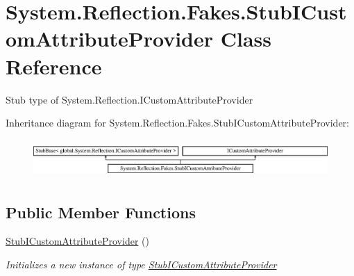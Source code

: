 \hypertarget{class_system_1_1_reflection_1_1_fakes_1_1_stub_i_custom_attribute_provider}{\section{System.\-Reflection.\-Fakes.\-Stub\-I\-Custom\-Attribute\-Provider Class Reference}
\label{class_system_1_1_reflection_1_1_fakes_1_1_stub_i_custom_attribute_provider}
}


Stub type of System.\-Reflection.\-I\-Custom\-Attribute\-Provider 


Inheritance diagram for System.\-Reflection.\-Fakes.\-Stub\-I\-Custom\-Attribute\-Provider\-:\begin{figure}[H]
\begin{center}
\leavevmode
\includegraphics[height=1.477572cm]{class_system_1_1_reflection_1_1_fakes_1_1_stub_i_custom_attribute_provider}
\end{center}
\end{figure}
\subsection*{Public Member Functions}
\begin{DoxyCompactItemize}
\item 
\hyperlink{class_system_1_1_reflection_1_1_fakes_1_1_stub_i_custom_attribute_provider_af181a942f987ccc3a97237ee8a5339df}{Stub\-I\-Custom\-Attribute\-Provider} ()
\begin{DoxyCompactList}\small\item\em Initializes a new instance of type \hyperlink{class_system_1_1_reflection_1_1_fakes_1_1_stub_i_custom_attribute_provider}{Stub\-I\-Custom\-Attribute\-Provider}\end{DoxyCompactList}\end{DoxyCompactItemize}
